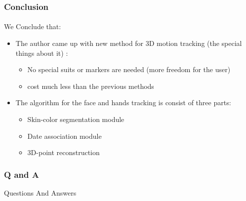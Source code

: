 \documentclass{beamer}
\begin{document}
\begin{frame}
\frametitle{Conclusion }
\framesubtitle{}
We Conclude that: 
\begin{itemize} 
\item The author came up with new method for 3D motion tracking (the special things about it) :
	\begin{itemize}
	\item No special suits or markers are needed (more freedom for the user) 
	\item cost much less than the previous methods
	\end{itemize} 
\item The algorithm for the face and hands tracking is consist of three parts:
 	\begin{itemize}
	\item Skin-color segmentation module
	\item Date association module
	\item 3D-point reconstruction
	\end{itemize} 
\end{itemize}
\end{frame}

\begin{frame}
\frametitle{Q and A}

\Huge Questions And Answers
\framesubtitle{}

\end{frame}
\end{document}
